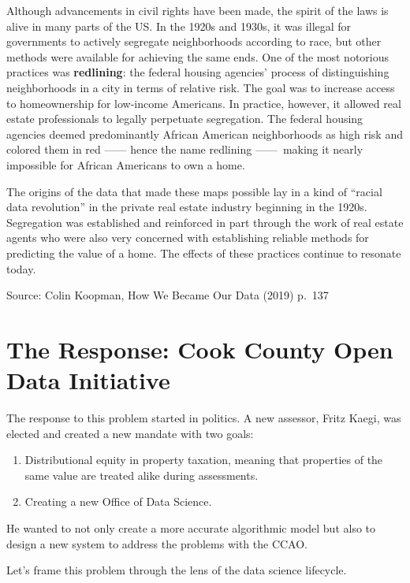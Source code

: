 \documentclass[
  letterpaper,
  DIV=11,
  numbers=noendperiod]{scrreprt}
\providecommand{\tightlist}{%
  \setlength{\itemsep}{0pt}\setlength{\parskip}{0pt}}\usepackage{longtable,booktabs,array}
\begin{document}
Although advancements in civil rights have been made, the spirit of the
laws is alive in many parts of the US. In the 1920s and 1930s, it was
illegal for governments to actively segregate neighborhoods according to
race, but other methods were available for achieving the same ends. One
of the most notorious practices was \textbf{redlining}: the federal
housing agencies' process of distinguishing neighborhoods in a city in
terms of relative risk. The goal was to increase access to homeownership
for low-income Americans. In practice, however, it allowed real estate
professionals to legally perpetuate segregation. The federal housing
agencies deemed predominantly African American neighborhoods as high
risk and colored them in red ------ hence the name redlining
------~making it nearly impossible for African Americans to own a home.

The origins of the data that made these maps possible lay in a kind of
``racial data revolution'' in the private real estate industry beginning
in the 1920s. Segregation was established and reinforced in part through
the work of real estate agents who were also very concerned with
establishing reliable methods for predicting the value of a home. The
effects of these practices continue to resonate today.

Source: Colin Koopman, How We Became Our Data (2019) p.~137

\section{The Response: Cook County Open Data
Initiative}\label{the-response-cook-county-open-data-initiative}

The response to this problem started in politics. A new assessor, Fritz
Kaegi, was elected and created a new mandate with two goals:

\begin{enumerate}
\def\labelenumi{\arabic{enumi}.}
\tightlist
\item
  Distributional equity in property taxation, meaning that properties of
  the same value are treated alike during assessments.
\item
  Creating a new Office of Data Science.
\end{enumerate}

He wanted to not only create a more accurate algorithmic model but also
to design a new system to address the problems with the CCAO.

Let's frame this problem through the lens of the data science lifecycle.
\end{document}
